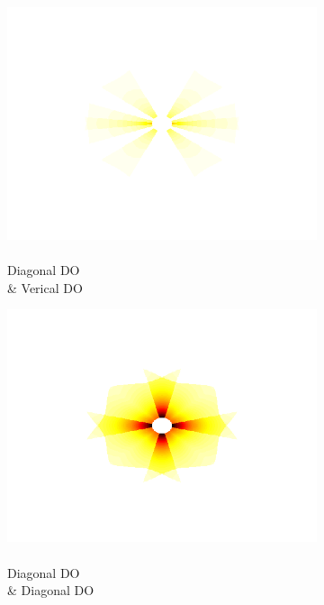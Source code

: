\documentclass[journal,onecolumn]{IEEEtran}
\begin{document}
\begin{figure}[h]
    \par \bigskip
    \begin{subfigure}[b]{0.2\textwidth}
            \centering
            \captionsetup{justification=centering}
            \includegraphics[width=.85\linewidth]{map-w_2_1}
            \caption{\\ Diagonal DO \\ \& Verical DO}
    \end{subfigure}%
    \begin{subfigure}[b]{0.2\textwidth}
            \centering
            \captionsetup{justification=centering}
            \includegraphics[width=.85\linewidth]{map-w_2_2}
            \caption{\\ Diagonal DO \\ \& Diagonal DO}
    \end{subfigure}%
    \begin{subfigure}[b]{0.2\textwidth}
            \centering
            \captionsetup{justification=centering}

\end{subfigure}
\end{figure}
\end{document}
